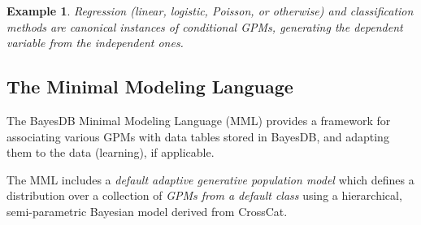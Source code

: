 \documentclass[10pt,letterpaper]{article}
\newtheorem{example}{Example}[section]
\begin{document}
\begin{example}
Regression (linear, logistic, Poisson, or otherwise) and classification methods
are canonical instances of conditional GPMs, generating the dependent
variable from the independent ones.
\end{example}

\subsection{The Minimal Modeling Language}
\label{sec:mml}

The BayesDB Minimal Modeling Language (MML) provides a framework for
associating various GPMs with data tables stored in BayesDB, and
adapting them to the data (learning), if applicable.

The MML includes a \textit{default adaptive generative population
  model} which defines a distribution over a collection of
\textit{GPMs from a default class} using a hierarchical, semi-parametric
Bayesian model derived from CrossCat.
\end{document}
